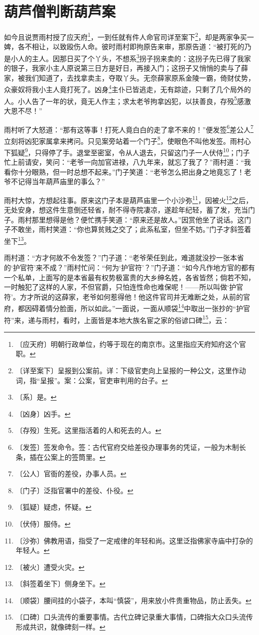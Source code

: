 \documentclass[12pt,UTF-8,openany]{ctexbook}
\begin{document}
\chapter{葫芦僧判断葫芦案}

\begin{large}
    
    如今且说贾雨村授了应天府\footnote{〔应天府〕明朝行政单位，约等于现在的南京市。这里指应天府知府这个官职。}，一到任就有件人命官司详至案下\footnote{〔详至案下〕呈报到公案前。详：下级官吏向上呈报的一种公文，这里作动词，指“呈报”。案：公案，官吏审判用的台子。}，却是两家争买一婢，各不相让，以致殴伤人命。彼时雨村即拘原告来审，那原告道：“被打死的乃是小人的主人。因那日买了个丫头，不想系\footnote{〔系〕是。}拐子拐来卖的：这拐子先已得了我家的银子，我家小主人原说第三日方是好日，再接入门；这拐子又悄悄的卖与了薛家，被我们知道了，去找拿卖主，夺取丫头。无奈薛家原系金陵一霸，倚财仗势，众豪奴将我小主人竟打死了。凶身\footnote{〔凶身〕凶手。}主仆已皆逃走，无有踪迹，只剩了几个局外的人。小人告了一年的状，竟无人作主；求太老爷拘拿凶犯，以扶善良，存殁\footnote{〔存殁〕生死。这里指活着的人和死去的人。}感激大恩不尽！”
    
    雨村听了大怒道：“那有这等事！打死人竟白白的走了拿不来的！”便发签\footnote{〔发签〕签发命令。签：古代官府交给差役办理事务的凭证，一般为木制长条，插在公案上的签筒里。}差公人\footnote{〔公人〕官衙的差役，办事人员。}立刻将凶犯家属拿来拷问。只见案旁站着一个门子\footnote{〔门子〕泛指官署中的差役、仆役。}，使眼色不叫他发签。雨村心下狐疑\footnote{〔狐疑〕疑虑，怀疑。}，只得停了手。退堂至密室，令从人退去，只留这门子一人伏侍\footnote{〔伏侍〕服侍。}；门子忙上前请安，笑问：“老爷一向加官进禄，八九年来，就忘了我了？”雨村道：“我看你十分眼熟，但一时总想不起来。”门子笑道：“老爷怎么把出身之地竟忘了！老爷不记得当年葫芦庙里的事么？”
    
    雨村大惊，方想起往事。原来这门子本是葫芦庙里一个小沙弥\footnote{〔沙弥〕佛教用语，指受了一定戒律的年轻和尚。这里泛指佛家寺庙中打杂的年轻人。}，因被火\footnote{〔被火〕遭受火灾。}之后，无处安身，想这件生意倒还轻省，耐不得寺院凄凉，遂趁年纪轻，蓄了发，充当门子。雨村那里想得是他？便忙携手笑道：“原来还是故人。”因赏他坐了说话。这门子不敢坐，雨村笑道：“你也算贫贱之交了；此系私室，但坐不妨。”门子才斜签着坐下\footnote{〔斜签着坐下〕侧身坐下。}。
    
    雨村道：“方才何故不令发签？”门子道：“老爷荣任到此，难道就没抄一张本省的‘护官符’来不成？”雨村忙问：“何为‘护官符’？”门子道：“如今凡作地方官的都有一个私单，上面写的是本省最有权势极富贵的大乡绅名姓，各省皆然；倘若不知，一时触犯了这样的人家，不但官爵，只怕连性命也难保呢！——所以叫做‘护官符’。方才所说的这薛家，老爷如何惹得他！他这件官司并无难断之处，从前的官府，都因碍着情分脸面，所以如此。”一面说，一面从顺袋\footnote{〔顺袋〕腰间挂的小袋子，本叫“慎袋”，用来放小件贵重物品，防止丢失。}中取出一张抄的“护官符”来，递与雨村，看时，上面皆是本地大族名宦之家的俗谚口碑\footnote{〔口碑〕口头流传的重要事情。古代立碑记录重大事情，口碑指大众口头流传形成共识，就像碑刻一样。}，云：
    

\end{large}
\end{document}
